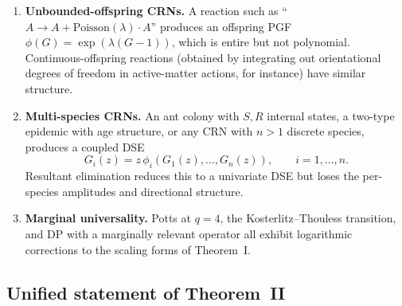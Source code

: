 \documentclass[11pt,a4paper]{article}
\theoremstyle{plain}
\theoremstyle{definition}
\begin{document}
\begin{enumerate}[label=(\roman*), leftmargin=1.8em]
  \item \textbf{Unbounded-offspring CRNs.}  A reaction such as
    ``$A \to A + \text{Poisson}(\lambda) \cdot A$'' produces an
    offspring PGF $\phi(G) = \exp(\lambda(G-1))$, which is entire but
    not polynomial.  Continuous-offspring reactions (obtained by
    integrating out orientational degrees of freedom in active-matter
    actions, for instance) have similar structure.
  \item \textbf{Multi-species CRNs.}  An ant colony with $S, R$
    internal states, a two-type epidemic with age structure, or any
    CRN with $n > 1$ discrete species, produces a coupled DSE
    \[
      G_i(z) = z\,\phi_i(G_1(z), \dots, G_n(z)), \qquad i = 1, \dots, n.
    \]
    Resultant elimination reduces this to a univariate DSE but loses
    the per-species amplitudes and directional structure.
  \item \textbf{Marginal universality.}  Potts at $q = 4$, the
    Kosterlitz--Thouless transition, and DP with a marginally
    relevant operator all exhibit logarithmic corrections to the
    scaling forms of Theorem~I.
\end{enumerate}

\subsection{Unified statement of Theorem~II}
\end{document}

